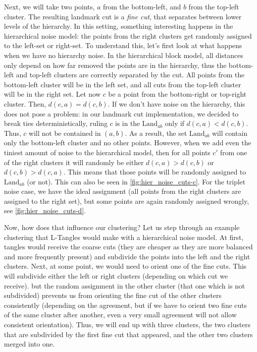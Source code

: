 Next, we will take two points, $a$ from the bottom-left, and $b$ from the top-left cluster. The resulting landmark cut is a \textit{fine cut}, that separates between lower levels of the hierarchy.
In this setting, something interesting happens in the hierarchical noise model: the points from the right clusters get randomly assigned to the left-set or right-set. 
To understand this, let's first look at what happens when we have no hierarchy noise. 
In the hierarchical block model, all distances only depend on how far removed the points are in the hierarchy, 
thus the bottom-left and top-left clusters are correctly separated by the cut. All points from
the bottom-left cluster will be in the left set, and all cuts from the top-left cluster will be in the right set.
Let now $c$ be a point from the bottom-right or top-right cluster. Then, $d(c,a) = d(c,b)$. 
If we don't have noise on the hierarchy, this does not pose a problem: in our landmark cut implementation, we decided to break ties deterministically, ruling $c$ is in the 
$\text{Land}_{ab}$ only if $d(c,a) < d(c,b)$. Thus, $c$ will not be contained in $(a,b)$. As a result, the set $\text{Land}_{ab}$ will contain 
only the bottom-left cluster and no other points.
However, when we add even the tiniest amount of noise to the hierarchical model, then for all points $c'$ from one of the right clusters 
it will randomly be either $d(c,a) > d(c,b)$ or $d(c,b) > d(c,a)$. This means that those points will be randomly assigned to $\text{Land}_{ab}$ (or not).
This can also be seen in \autoref{fig:hier_noise_cuts-c}. For the triplet noise case, we have the ideal assignment (all points from the right clusters are assigned to the right set), 
but some points are again randomly assigned wrongly, see \autoref{fig:hier_noise_cuts-d}.

Now, how does that influence our clustering? Let us step through an example clustering that L-Tangles would make with a hierarchical noise model. 
At first, tangles would receive the coarse cuts (they are cheaper as they are more balanced and more frequently present) and subdivide the points into the
left and the right clusters. Next, at some point, we would need to orient one of the fine cuts. This will subdivide either the left or right clusters (depending on which cut we receive). but
the random assignment in the other cluster (that one which is not subdivided) prevents us from orienting the fine cut of the other clusters consistently (depending on the agreement, but if we 
have to orient two fine cuts of the same cluster after another, even a very small agreement will not allow consistent orientation). Thus, we will end up with three clusters, the two clusters that are
subdivided by the first fine cut that appeared, and the other two clusters merged into one. 

